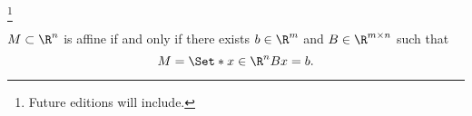 
  \ifhmode\unskip\fi\footnote{
Future editions will include.
  }


\begin{proposition}
$M \subset \R^{n}$ is affine if and only if there exists $b \in \R^m$ and $B \in \R^{m \times n}$ such that
  \[
M = \Set*{x \in \R^{n}}{Bx = b}.
  \]
\end{proposition}

\blankpage
